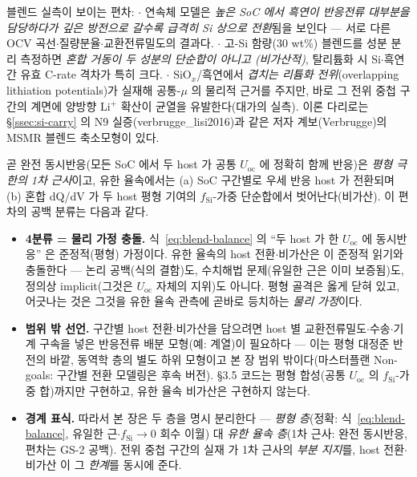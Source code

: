 \begin{srcbox}
블렌드 실측이 보이는 편차:
$\cdot$ 연속체 모델은 \emph{높은 SoC 에서 흑연이 반응전류 대부분을 담당하다가 깊은 방전으로 갈수록
급격히 Si 상으로 전환}됨을 보인다 --- 서로 다른 OCV 곡선$\cdot$질량분율$\cdot$교환전류밀도의
결과다\cite{ai_composite2022}.
$\cdot$ 고-Si 함량(30 wt\%) 블렌드를 성분 분리 측정하면 \emph{혼합 거동이 두 성분의 단순합이 아니고
(비가산적)}, 탈리튬화 시 Si$\cdot$흑연 간 유효 C-rate 격차가 특히 크다\cite{chatzogiannakis_blend2025}.
$\cdot$ SiO$_x$/흑연에서 \emph{겹치는 리튬화 전위}(overlapping lithiation potentials)가 실재해 공통-$\mu$
의 물리적 근거를 주지만, 바로 그 전위 중첩 구간의 계면에 양방향 Li$^+$ 확산이 균열을 유발한다(대가의
실측)\cite{zhan_siox2026}. 이론 다리로는 \S\ref{ssec:si-carry} 의 N9 실증(verbrugge\_lisi2016)과
같은 저자 계보(Verbrugge)의 MSMR 블렌드 축소모형이 있다\cite{tu_blend2024}.
\end{srcbox}

곧 완전 동시반응(모든 SoC 에서 두 host 가 공통 $U_\mathrm{oc}$ 에 정확히 함께 반응)은 \emph{평형 극한의
1차 근사}이고, 유한 율속에서는 (a) SoC 구간별로 우세 반응 host 가 전환되며 (b) 혼합 dQ/dV 가 두 host
평형 기여의 $f_\mathrm{Si}$-가중 단순합에서 벗어난다(비가산). 이 편차의 공백 분류는 다음과 같다.
\begin{itemize}[leftmargin=1.4em,itemsep=1pt]
\item \textbf{4분류 = 물리 가정 충돌.} 식~\eqref{eq:blend-balance} 의 ``두 host 가 한 $U_\mathrm{oc}$
에 동시반응'' 은 준정적(평형) 가정이다. 유한 율속의 host 전환$\cdot$비가산은 이 준정적 읽기와 충돌한다
--- 논리 공백(식의 결함)도, 수치해법 문제(유일한 근은 이미 보증됨)도, 정의상 implicit(그것은
$U_\mathrm{oc}$ 자체의 지위)도 아니다. 평형 골격은 옳게 닫혀 있고, 어긋나는 것은 그것을 유한 율속
관측에 곧바로 등치하는 \emph{물리 가정}이다.
\item \textbf{범위 밖 선언.} 구간별 host 전환$\cdot$비가산을 담으려면 host 별 교환전류밀도$\cdot$수송$\cdot$기계
구속을 넣은 반응전류 배분 모형(예: \cite{ai_composite2022} 계열)이 필요하다 --- 이는 평형 대정준 반전의
바깥, 동역학 층의 별도 하위 모형이고 본 장 범위 밖이다(마스터플랜 Non-goals: 구간별 전환 모델링은 후속
버전). §3.5 코드는 평형 합성(공통 $U_\mathrm{oc}$ 의 $f_\mathrm{Si}$-가중 합)까지만 구현하고, 유한 율속
비가산은 구현하지 않는다.
\item \textbf{경계 표식.} 따라서 본 장은 두 층을 명시 분리한다 --- \emph{평형 층}(정확: 식~\eqref{eq:blend-balance},
유일한 근$\cdot$$f_\mathrm{Si}\to0$ 회수 이월) 대 \emph{유한 율속 층}(1차 근사: 완전 동시반응, 편차는 GS-2
공백). 전위 중첩 구간의 실재\cite{zhan_siox2026} 가 1차 근사의 \emph{부분 지지}를, host 전환$\cdot$비가산
\cite{ai_composite2022,chatzogiannakis_blend2025} 이 그 \emph{한계}를 동시에 준다.
\end{itemize}


